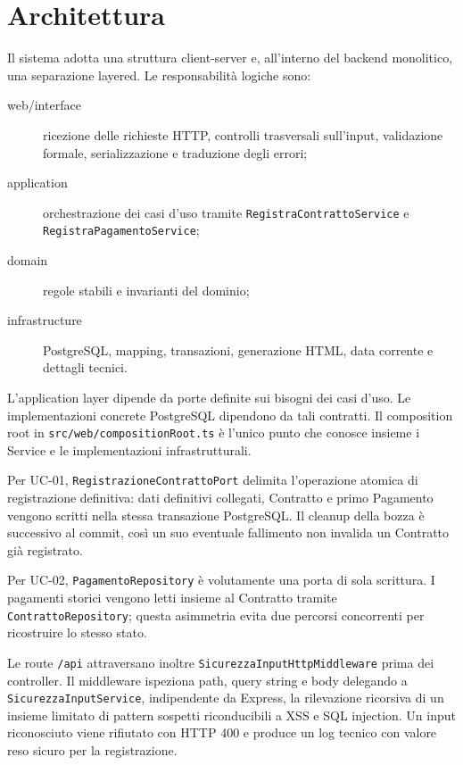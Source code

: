 \documentclass[11pt,a4paper]{article}
\begin{document}
\section{Architettura}

Il sistema adotta una struttura client-server e, all'interno del backend monolitico, una separazione layered. Le responsabilità logiche sono:

\begin{description}
  \item[web/interface] ricezione delle richieste HTTP, controlli trasversali sull'input, validazione formale, serializzazione e traduzione degli errori;
  \item[application] orchestrazione dei casi d'uso tramite \texttt{RegistraContrattoService} e \texttt{RegistraPagamentoService};
  \item[domain] regole stabili e invarianti del dominio;
  \item[infrastructure] PostgreSQL, mapping, transazioni, generazione HTML, data corrente e dettagli tecnici.
\end{description}

L'application layer dipende da porte definite sui bisogni dei casi d'uso. Le implementazioni concrete PostgreSQL dipendono da tali contratti. Il composition root in \texttt{src/web/compositionRoot.ts} è l'unico punto che conosce insieme i Service e le implementazioni infrastrutturali.

Per UC-01, \texttt{RegistrazioneContrattoPort} delimita l'operazione atomica di registrazione definitiva: dati definitivi collegati, Contratto e primo Pagamento vengono scritti nella stessa transazione PostgreSQL. Il cleanup della bozza è successivo al commit, così un suo eventuale fallimento non invalida un Contratto già registrato.

Per UC-02, \texttt{PagamentoRepository} è volutamente una porta di sola scrittura. I pagamenti storici vengono letti insieme al Contratto tramite \texttt{ContrattoRepository}; questa asimmetria evita due percorsi concorrenti per ricostruire lo stesso stato.

Le route \texttt{/api} attraversano inoltre \texttt{SicurezzaInputHttpMiddleware} prima dei controller. Il middleware ispeziona path, query string e body delegando a \texttt{SicurezzaInputService}, indipendente da Express, la rilevazione ricorsiva di un insieme limitato di pattern sospetti riconducibili a XSS e SQL injection. Un input riconosciuto viene rifiutato con HTTP 400 e produce un log tecnico con valore reso sicuro per la registrazione.
\end{document}
